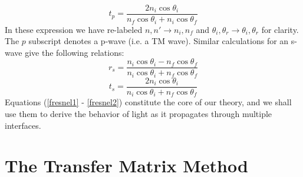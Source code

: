 \documentclass[preprint, onecolumn, amsmath, amssymb, aps]{revtex4-1}
\numberwithin{equation}{section}
\begin{document}
\begin{equation}
t_{p} = \frac{ 2 n_{i} \cos \theta_{i} }{ n_{f} \cos \theta_{i} + n_{i} \cos \theta_{f}}
\end{equation}
\noindent
In these expression we have re-labeled $n, n' \rightarrow n_{i}, n_{f}$ and $\theta_{i}, \theta_{r} \rightarrow \theta_{i}, \theta_{r}$ for clarity. The $p$ subscript denotes a p-wave (i.e. a TM wave). Similar calculations for an s-wave give the following relations:
\begin{equation}
r_{s} = \frac{ n_{i} \cos \theta_{i} - n_{f} \cos \theta_{f} }{ n_{i} \cos \theta_{i} + n_{f} \cos \theta_{f}}
\end{equation}
\begin{equation}\label{fresnel2}
t_{s} = \frac{ 2 n_{i} \cos \theta_{i} }{ n_{i} \cos \theta_{i} + n_{f} \cos \theta_{f}}
\end{equation}
\noindent
Equations (\ref{fresnel1} - \ref{fresnel2}) constitute the core of our theory, and we shall use them to derive the behavior of light as it propagates through multiple interfaces.

\section{The Transfer Matrix Method}
\end{document}
